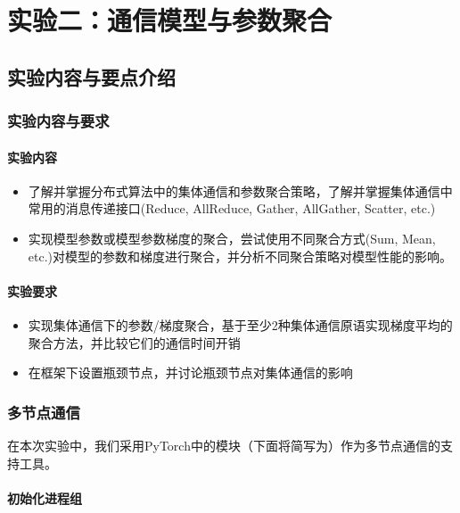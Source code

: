 \chapter{实验二：通信模型与参数聚合}

\section{实验内容与要点介绍}

\subsection{实验内容与要求}

\subsubsection{实验内容}
\begin{itemize}
    \item 了解并掌握分布式算法中的集体通信和参数聚合策略，了解并掌握集体通信中常用的消息传递接口(Reduce, AllReduce, Gather, AllGather, Scatter, etc.)
    \item 实现模型参数或模型参数梯度的聚合，尝试使用不同聚合方式(Sum, Mean, etc.)对模型的参数和梯度进行聚合，并分析不同聚合策略对模型性能的影响。    
\end{itemize}

\subsubsection{实验要求}
\begin{itemize}
    \item 实现集体通信下的参数/梯度聚合，基于至少2种集体通信原语实现梯度平均的聚合方法，并比较它们的通信时间开销
    \item 在框架下设置瓶颈节点，并讨论瓶颈节点对集体通信的影响
\end{itemize}

\subsection{多节点通信}

在本次实验中，我们采用PyTorch中的模块（下面将简写为）作为多节点通信的支持工具。

\subsubsection{初始化进程组}

